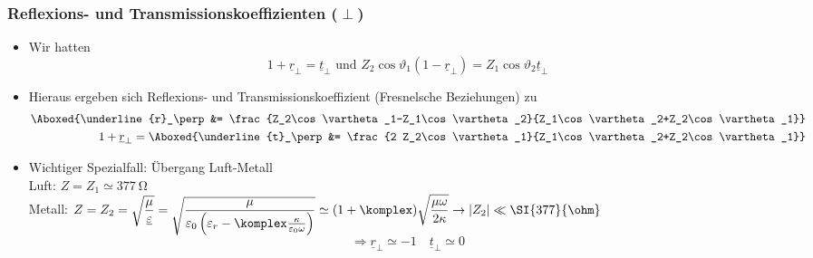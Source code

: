 \begin{frame}
  \frametitle{Reflexions- und Transmissionskoeffizienten (\(\perp\))}  
\begin{itemize}[<+->]
\item Wir hatten 
  \begin{equation*}
    1+\underline{r}_\perp = \underline{t}_\perp \text{ und } Z_2\cos\vartheta_1\left(1-\underline{r}_\perp\right) = Z_1 \cos\vartheta_2\underline{t}_\perp
  \end{equation*}
  \item Hieraus ergeben sich Reflexions- und Transmissionskoeffizient (\alert{Fresnelsche Beziehungen}) zu
    \begin{align*}
\Aboxed{\underline{r}_\perp &= \frac{Z_2\cos\vartheta_1-Z_1\cos\vartheta_2}{Z_1\cos\vartheta_2+Z_2\cos\vartheta_1}} \\
1+\underline{r}_\perp = \Aboxed{\underline{t}_\perp &= \frac{2 Z_2\cos\vartheta_1}{Z_1\cos\vartheta_2+Z_2\cos\vartheta_1}} 
    \end{align*}
  \item Wichtiger Spezialfall: Übergang Luft-Metall\\
    Luft: \(Z=Z_1\simeq\SI{377}{\ohm}\)\\
    Metall: \({\displaystyle Z=Z_2 = \sqrt{\frac{\mu}{\underline{\varepsilon}}}  = \sqrt{\frac{\mu}{\varepsilon_0\left(\varepsilon_r -\komplex\frac{\kappa}{\varepsilon_0\omega}\right)}} \simeq (1+\komplex)\sqrt{\frac{\mu\omega}{2\kappa}} \to \left|Z_2\right| \ll \SI{377}{\ohm}}\)
    \begin{equation*}
    \Rightarrow \boxed{\underline{r}_\perp \simeq -1 \quad \underline{t}_\perp \simeq 0}
    \end{equation*}
\end{itemize}
\end{frame}

